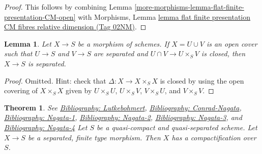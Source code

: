 \documentclass{amsart}
\newenvironment{reference}{\comment}{\endcomment}
\theoremstyle{plain}
\newtheorem{theorem}[subsection]{Theorem}
\newtheorem{lemma}[subsection]{Lemma}
\theoremstyle{definition}
\theoremstyle{remark}
\numberwithin{equation}{subsection}
\begin{document}
\begin{proof}
This follows by combining
Lemma \ref{more-morphisms-lemma-flat-finite-presentation-CM-open}
with
Morphisms, Lemma
\href{https://stacks.math.columbia.edu/tag/02NM}{lemma flat finite presentation CM fibres relative dimension (Tag 02NM)}.
\end{proof}



\begin{lemma}
\label{lemma-check-separated}
Let $X \to S$ be a morphism of schemes. If $X = U \cup V$
is an open cover such that $U \to S$ and $V \to S$ are separated
and $U \cap V \to U \times_S V$ is closed, then
$X \to S$ is separated.
\end{lemma}

\begin{proof}
Omitted. Hint: check that $\Delta : X \to X \times_S X$ is
closed by using the open covering of $X \times_S X$ given by
$U \times_S U$, $U \times_S V$, $V \times_S U$, and $V \times_S V$.
\end{proof}


\begin{theorem}
\label{theorem-nagata}
\begin{reference}
See \href{https://stacks.math.columbia.edu/bibliography}{Bibliography: Lutkebohmert}, \href{https://stacks.math.columbia.edu/bibliography}{Bibliography: Conrad-Nagata}, \href{https://stacks.math.columbia.edu/bibliography}{Bibliography: Nagata-1},
\href{https://stacks.math.columbia.edu/bibliography}{Bibliography: Nagata-2}, \href{https://stacks.math.columbia.edu/bibliography}{Bibliography: Nagata-3}, and \href{https://stacks.math.columbia.edu/bibliography}{Bibliography: Nagata-4}
\end{reference}
Let $S$ be a quasi-compact and quasi-separated scheme. Let
$X \to S$ be a separated, finite type morphism.
Then $X$ has a compactification over $S$.
\end{theorem}
\end{document}
